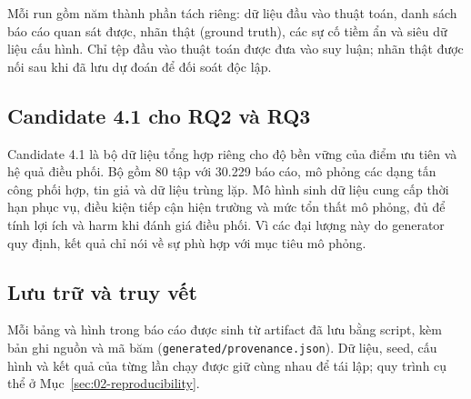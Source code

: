 Mỗi run gồm năm thành phần tách riêng: dữ liệu đầu vào thuật toán, danh sách báo cáo quan sát được, nhãn thật (ground truth), các sự cố tiềm ẩn và siêu dữ liệu cấu hình. Chỉ tệp đầu vào thuật toán được đưa vào suy luận; nhãn thật được nối sau khi đã lưu dự đoán để đối soát độc lập.

\subsection{Candidate 4.1 cho RQ2 và RQ3}
Candidate 4.1 là bộ dữ liệu tổng hợp riêng cho độ bền vững của điểm ưu tiên và hệ quả điều phối. Bộ gồm 80 tập với 30.229 báo cáo, mô phỏng các dạng tấn công phối hợp, tin giả và dữ liệu trùng lặp. Mô hình sinh dữ liệu cung cấp thời hạn phục vụ, điều kiện tiếp cận hiện trường và mức tổn thất mô phỏng, đủ để tính lợi ích và harm khi đánh giá điều phối. Vì các đại lượng này do generator quy định, kết quả chỉ nói về sự phù hợp với mục tiêu mô phỏng.

\subsection{Lưu trữ và truy vết}
Mỗi bảng và hình trong báo cáo được sinh từ artifact đã lưu bằng script, kèm bản ghi nguồn và mã băm (\texttt{generated/provenance.json}). Dữ liệu, seed, cấu hình và kết quả của từng lần chạy được giữ cùng nhau để tái lập; quy trình cụ thể ở Mục~\ref{sec:02-reproducibility}.
